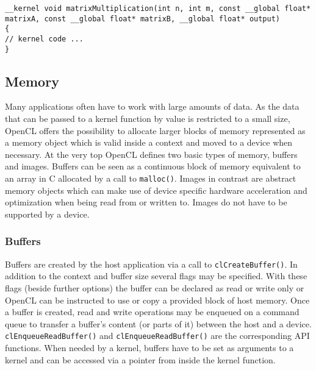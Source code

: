 \begin{lstlisting}[caption={An example of a \lstinline!__kernel! function's signature.},label={lst:kernel_example}]
__kernel void matrixMultiplication(int n, int m, const __global float* matrixA, const __global float* matrixB, __global float* output)
{
// kernel code ...
}
\end{lstlisting}


\subsection{Memory}
Many applications often have to work with large amounts of data. As the data that can be passed to a kernel function by value is restricted to a small size, OpenCL offers the possibility to allocate larger blocks of memory represented as a memory object which is valid inside a context and moved to a device when necessary. At the very top OpenCL defines two basic types of memory, buffers and images. Buffers can be seen as a continuous block of memory equivalent to an array in C allocated by a call to \lstinline!malloc()!. Images in contrast are abstract memory objects which can make use of device specific hardware acceleration and optimization when being read from or written to. Images do not have to be supported by a device. \cite[p.23f]{opencl_book}

\subsubsection{Buffers}
Buffers are created by the host application via a call to \lstinline!clCreateBuffer()!. In addition to the context and buffer size several flags may be specified. With these flags (beside further options) the buffer can be declared as read or write only or OpenCL can be instructed to use or copy a provided block of host memory. Once a buffer is created, read and write operations may be enqueued on a command queue to transfer a buffer's content (or parts of it) between the host and a device. \lstinline!clEnqueueReadBuffer()! and \lstinline!clEnqueueReadBuffer()! are the corresponding API functions. When needed by a kernel, buffers have to be set as arguments to a kernel and can be accessed via a pointer from inside the kernel function. \cite[p.24]{opencl_book}

